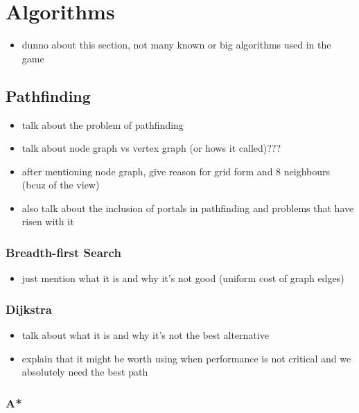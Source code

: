 \section{Algorithms}

\begin{itemize}
    \item dunno about this section, not many known or big
        algorithms used in the game
\end{itemize}

\subsection{Pathfinding}

\begin{itemize}
    \item talk about the problem of pathfinding
    \item talk about node graph vs vertex graph (or hows it called)???
    \item after mentioning node graph, give reason for grid form
	    and 8 neighbours (bcuz of the view)
    \item also talk about the inclusion of portals in pathfinding
	    and problems that have risen with it
\end{itemize}

\subsubsection{Breadth-first Search}

\begin{itemize}
    \item just mention what it is and why it's not good
	    (uniform cost of graph edges)
\end{itemize}

\subsubsection{Dijkstra}

\begin{itemize}
    \item talk about what it is and why it's not the best alternative
    \item explain that it might be worth using when performance is
	    not critical and we absolutely need the best path
\end{itemize}

\subsubsection{A*}

